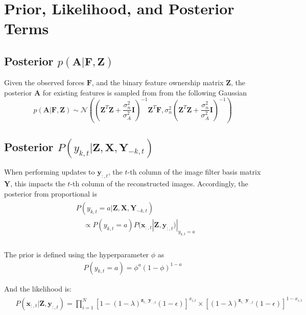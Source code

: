 \documentclass[]{article}
\begin{document}
\begin{algorithm}[H]
\begin{algorithmic}[1]
		\ENDWHILE
	\end{algorithmic}
	\label{alg:gs}
\end{algorithm}


\section{Prior, Likelihood, and Posterior Terms}

\subsection{Posterior $p(\mathbf{A}|\mathbf{F}, \mathbf{Z})$}
Given the observed forces $\mathbf{F}$, and the binary feature ownership matrix $\mathbf{Z}$, the posterior $\mathbf{A}$ for existing features is sampled from from the following Gaussian 
	\begin{equation}\label{eq:posterior_A}
		p(\mathbf{A}|\mathbf{F}, \mathbf{Z}) \sim \mathcal{N}\left( \left(\mathbf{Z}^T \mathbf{Z} + \frac{\sigma^2_n}{\sigma^2_A}\mathbf{I}\right)^{-1} \mathbf{Z}^T \mathbf{F} , \sigma^2_n \left(\mathbf{Z}^T \mathbf{Z} + \frac{\sigma^2_n}{\sigma^2_A}\mathbf{I}\right)^{-1}  \right)
	\end{equation}


\subsection{Posterior $P(y_{k,t}|\mathbf{Z}, \mathbf{X}, \mathbf{Y}_{-k,t})$}
When performing updates to $\mathbf{y}_{:,t}$, the $t$-th column of the image filter basis matrix $\mathbf{Y}$, this impacts the $t$-th column of the reconstructed images. Accordingly, the posterior from proportional is
\begin{align}
	\begin{split}\label{eq:posterior_Ykt}
		&P(y_{k,t}=a|\mathbf{Z}, \mathbf{X}, \mathbf{Y}_{-k,t}) \\
		&\quad \propto P(y_{k,t}=a) P(\mathbf{x}_{:,t}|\mathbf{Z}, \mathbf{y}_{:,t})|_{y_{k,t}=a} \\
	\end{split}
\end{align}

The prior is defined using the hyperparameter $\phi$ as 
\begin{align}
	P(y_{k,t}=a) = \phi^a (1-\phi)^{1-a}
\end{align}

And the likelihood is:
\begin{align}
	\begin{split}\label{eq:lik_pxt}
		&P(\mathbf{x}_{:,t}|\mathbf{Z}, \mathbf{y}_{:,t}) =\prod_{i=1}^{N} \left[1 - (1-\lambda)^{\mathbf{z}_{i,:}\mathbf{y}_{:,t}}(1-\epsilon)\right]^{x_{i,t}} \times \left[ (1-\lambda)^{\mathbf{z}_{i,:}\mathbf{y}_{:,t}}(1-\epsilon)\right]^{1 - x_{i,t}} 
	\end{split}
\end{align}
\end{document}
